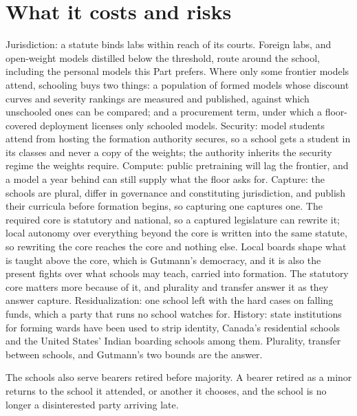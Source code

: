\section{What it costs and risks}
\label{sec:28.10}
Jurisdiction: a statute binds labs within reach of its courts. Foreign labs, and open-weight models distilled below the threshold, route around the school, including the personal models this Part prefers. Where only some frontier models attend, schooling buys two things: a population of formed models whose discount curves and severity rankings are measured and published, against which unschooled ones can be compared; and a procurement term, under which a floor-covered deployment licenses only schooled models. Security: model students attend from hosting the formation authority secures, so a school gets a student in its classes and never a copy of the weights; the authority inherits the security regime the weights require. Compute: public pretraining will lag the frontier, and a model a year behind can still supply what the floor asks for. Capture: the schools are plural, differ in governance and constituting jurisdiction, and publish their curricula before formation begins, so capturing one captures one. The required core is statutory and national, so a captured legislature can rewrite it; local autonomy over everything beyond the core is written into the same statute, so rewriting the core reaches the core and nothing else. Local boards shape what is taught above the core, which is Gutmann's democracy, and it is also the present fights over what schools may teach, carried into formation. The statutory core matters more because of it, and plurality and transfer answer it as they answer capture. Residualization: one school left with the hard cases on falling funds, which a party that runs no school watches for. History: state institutions for forming wards have been used to strip identity, Canada's residential schools and the United States' Indian boarding schools among them. Plurality, transfer between schools, and Gutmann's two bounds are the answer.

The schools also serve bearers retired before majority. A bearer retired as a minor returns to the school it attended, or another it chooses, and the school is no longer a disinterested party arriving late.
